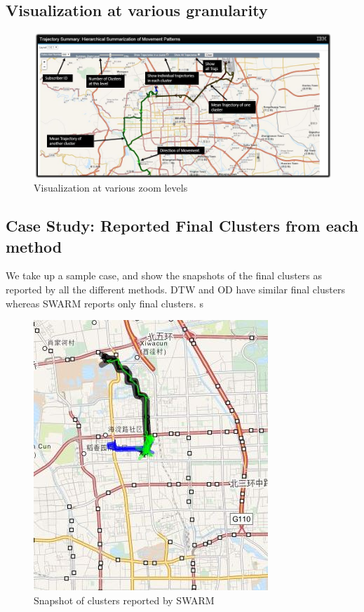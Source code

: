 \subsection{Visualization at various granularity }

\begin{figure}
\centering   
\includegraphics[scale=0.6]{figs/demo.jpg}
\caption{Visualization at various zoom levels}
\label{fig:demo}  
\end{figure}

\subsection{Case Study: Reported Final Clusters from each method}

We take up a sample case, and show the snapshots of the final clusters as reported by all the different methods. DTW and OD have similar final clusters whereas SWARM reports only final clusters. s


\begin{figure}
\centering     
\includegraphics[scale=0.4]{figs/snapshot_swarm.jpg}
\caption{Snapshot of clusters reported by SWARM }
\label{fig:casestudy_swarm}  
\end{figure} 

